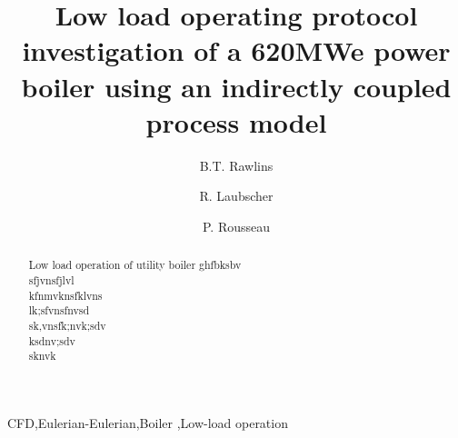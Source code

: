 \documentclass[review]{elsarticle}
\begin{document}
\begin{frontmatter}

\title{Low load operating protocol investigation of a 620MWe power boiler using an indirectly coupled process model}

\author{B.T. Rawlins}
\author{R. Laubscher}
\author{P. Rousseau}
\address{Department of Mechanical Engineering, Applied Thermal-Fluid Process Modeling Research Unit, University of Cape Town, Library Rd, Rondebosch, Cape Town, 7701, South Africa}

\begin{abstract}

Low load operation of utility boiler
ghfbksbv\\
sfjvnsfjlvl\\
kfnmvknsfklvns\\
lk;sfvnsfnvsd\\
sk,vnsfk;nvk;sdv\\
ksdnv;sdv\\
sknvk
\end{abstract}

\begin{keyword}
CFD\sep Eulerian-Eulerian\sep Boiler \sep Low-load operation
\end{keyword}

\end{frontmatter}




\printnomenclature
\end{document}
